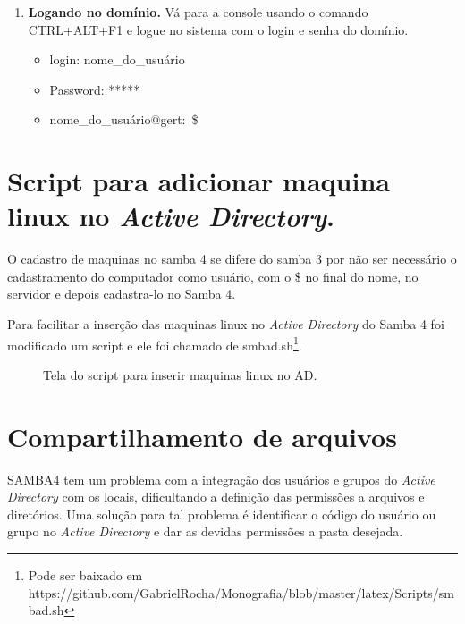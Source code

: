 \begin{enumerate}
	\item \textbf{Logando no domínio.}
		Vá para a console usando o comando CTRL+ALT+F1 e logue no sistema com o login e senha do domínio.

		\begin{itemize}
			\item {login: nome\_do\_usuário}
			\item {Password: *****}
			\item {nome\_do\_usuário$@$gert:~\$}
		\end{itemize}

\end{enumerate}

\section{Script para adicionar maquina linux no \textit{Active Directory}.}

O cadastro de maquinas no samba 4 se difere do samba 3 por não ser necessário o cadastramento do computador como usuário, com o \$ no final do nome, no servidor e depois cadastra-lo no Samba 4.

Para facilitar a inserção das maquinas linux no \textit{Active Directory} do Samba 4 foi modificado um script e ele foi chamado de smbad.sh\footnote[4]{Pode ser baixado em https://github.com/GabrielRocha/Monografia/blob/master/latex/Scripts/smbad.sh}. 

\begin{figure}[ht]
   	\centering
   	\caption{Tela do script para inserir maquinas linux no AD.}
    \label{smbad}
\end{figure}

\section{Compartilhamento de arquivos}

SAMBA4 tem um problema com a integração dos usuários e grupos do \textit{Active Directory} com os locais, dificultando a definição das permissões a arquivos e diretórios. Uma solução para tal problema é identificar o código do usuário ou grupo no \textit{Active Directory} e dar as devidas permissões a pasta desejada.

